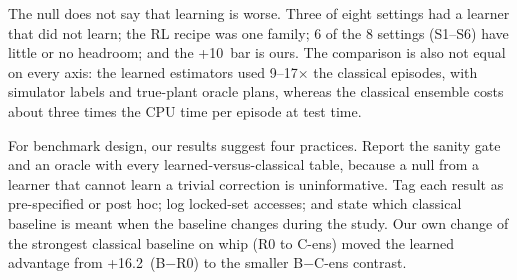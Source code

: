 The null does not say that learning is worse. Three of eight settings had a learner that did not learn; the RL recipe was one family; 6 of the 8 settings (S1--S6) have little or no headroom; and the +10\pp\ bar is ours. The comparison is also not equal on every axis: the learned estimators used 9--17$\times$ the classical episodes, with simulator labels and true-plant oracle plans, whereas the classical ensemble costs about three times the CPU time per episode at test time.

For benchmark design, our results suggest four practices. Report the sanity gate and an oracle with every learned-versus-classical table, because a null from a learner that cannot learn a trivial correction is uninformative. Tag each result as pre-specified or post hoc; log locked-set accesses; and state which classical baseline is meant when the baseline changes during the study. Our own change of the strongest classical baseline on whip (R0 to C-ens) moved the learned advantage from +16.2\pp\ (B$-$R0) to the smaller B$-$C-ens contrast.
